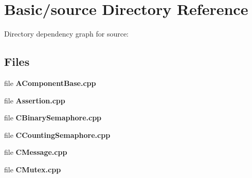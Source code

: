 \section{Basic/source Directory Reference}
\label{dir_2ce6463b12e67294cd055e56607959f0}
Directory dependency graph for source\-:
\subsection*{Files}
\begin{DoxyCompactItemize}
\item 
file {\bf A\-Component\-Base.\-cpp}
\item 
file {\bf Assertion.\-cpp}
\item 
file {\bf C\-Binary\-Semaphore.\-cpp}
\item 
file {\bf C\-Counting\-Semaphore.\-cpp}
\item 
file {\bf C\-Message.\-cpp}
\item 
file {\bf C\-Mutex.\-cpp}
\end{DoxyCompactItemize}
